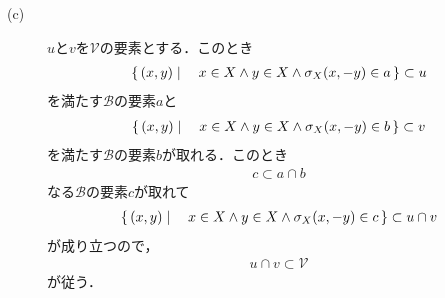 \begin{description}
		\item[(c)] $u$と$v$を$\mathscr{V}$の要素とする．このとき
			\begin{align}
				\left\{\, (x,y) \mid \quad x \in X \wedge y \in X \wedge \sigma_X(x,-y) \in a\, \right\} \subset u
			\end{align}
			を満たす$\mathscr{B}$の要素$a$と
			\begin{align}
				\left\{\, (x,y) \mid \quad x \in X \wedge y \in X \wedge \sigma_X(x,-y) \in b\, \right\} \subset v
			\end{align}
			を満たす$\mathscr{B}$の要素$b$が取れる．このとき
			\begin{align}
				c \subset a \cap b
			\end{align}
			なる$\mathscr{B}$の要素$c$が取れて
			\begin{align}
				\left\{\, (x,y) \mid \quad x \in X \wedge y \in X \wedge \sigma_X(x,-y) \in c\, \right\} \subset u \cap v
			\end{align}
			が成り立つので，
			\begin{align}
				u \cap v \subset \mathscr{V}
			\end{align}
			が従う．
			

\end{description}
